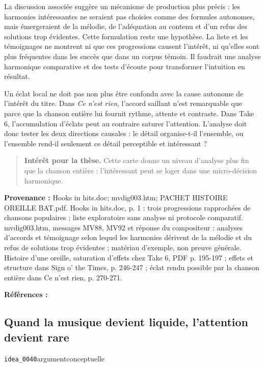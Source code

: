 \documentclass[10pt,a4paper]{article}
\begin{document}
La discussion associée suggère un mécanisme de production plus précis : les harmonies intéressantes ne seraient pas choisies comme des formules autonomes, mais émergeraient de la mélodie, de l'adéquation au contenu et d'un refus des solutions trop évidentes. Cette formulation reste une hypothèse. La liste et les témoignages ne montrent ni que ces progressions causent l'intérêt, ni qu'elles sont plus fréquentes dans les succès que dans un corpus témoin. Il faudrait une analyse harmonique comparative et des tests d'écoute pour transformer l'intuition en résultat.

Un éclat local ne doit pas non plus être confondu avec la cause autonome de l'intérêt du titre. Dans \emph{Ce n'est rien}, l'accord saillant n'est remarquable que parce que la chanson entière lui fournit rythme, attente et contraste. Dans Take 6, l'accumulation d'éclats peut au contraire saturer l'attention. L'analyse doit donc tester les deux directions causales : le détail organise-t-il l'ensemble, ou l'ensemble rend-il seulement ce détail perceptible et intéressant ?

\begin{quote}
\textbf{Intérêt pour la thèse.} Cette carte donne un niveau d'analyse plus fin que la chanson entière : l'intéressant peut se loger dans une micro-décision harmonique.
\end{quote}
{\footnotesize\color{metadata}\textbf{Provenance :} Hooks in hits.doc; mvdig003.htm; PACHET HISTOIRE OREILLE BAT.pdf. Hooks in hits.doc, p. 1 : trois progressions rapprochées de chansons populaires ; liste exploratoire sans analyse ni protocole comparatif. mvdig003.htm, messages MV88, MV92 et réponse du compositeur : analyses d'accords et témoignage selon lequel les harmonies dérivent de la mélodie et du refus de solutions trop évidentes ; matériau d'exemple, non preuve générale. Histoire d'une oreille, saturation d'effets chez Take 6, PDF p. 195-197 ; effets et structure dans Sign o' the Times, p. 246-247 ; éclat rendu possible par la chanson entière dans Ce n'est rien, p. 270-271.\par}
{\footnotesize\color{metadata}\textbf{Références :} \parencite{pachet2018oreille}\par}

\subsection{Quand la musique devient liquide, l'attention devient rare}
{\small\color{metadata} \texttt{idea\_0040}\quad\textbullet\quad argument\quad\textbullet\quad conceptuelle\par}
\end{document}
